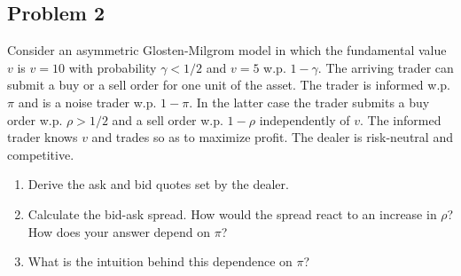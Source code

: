 \quad
\subsection*{Problem 2}

Consider an asymmetric Glosten-Milgrom model in which the fundamental value $v$ is $v=10$ with probability $\gamma < 1/2$ and $v=5$ w.p. $1-\gamma$. The arriving trader can submit a buy or a sell order for one unit of the asset. The trader is informed w.p. $\pi$ and is a noise trader w.p. $1-\pi$. In the latter case the trader submits a buy order w.p. $\rho > 1/2$ and a sell order w.p. $1-\rho$ independently of $v$. The informed trader knows $v$ and trades so as to maximize profit. The dealer is risk-neutral and competitive.

\begin{enumerate}
	\item Derive the ask and bid quotes set by the dealer.
	\item Calculate the bid-ask spread. How would the spread react to an increase in $\rho$? How does your answer depend on $\pi$? 
	\item What is the intuition behind this dependence on $\pi$?
\end{enumerate}

